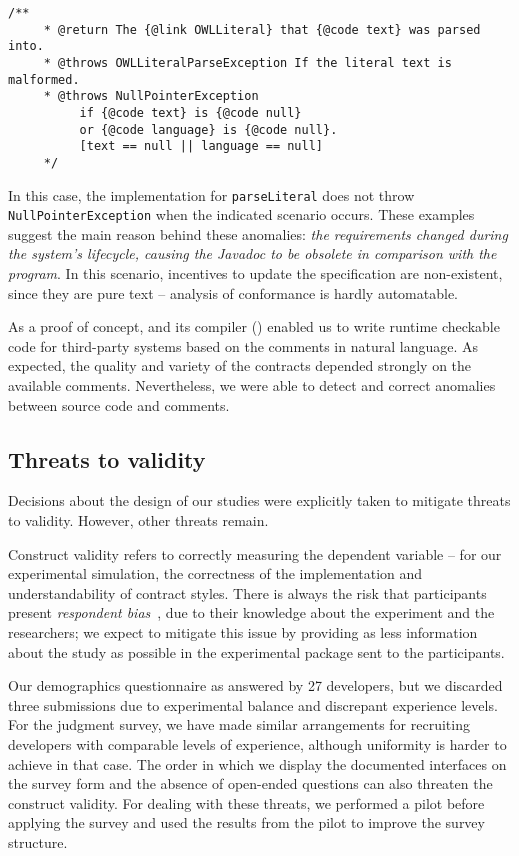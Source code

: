 \begin{lstlisting}[basicstyle=\footnotesize\ttfamily,name=figxpi, frame=lines, mathescape=true]
 /**
     * @return The {@link OWLLiteral} that {@code text} was parsed into.
     * @throws OWLLiteralParseException If the literal text is malformed.
     * @throws NullPointerException 
          if {@code text} is {@code null} 
          or {@code language} is {@code null}. 
          [text == null || language == null]
     */
\end{lstlisting}

In this case, the implementation for \texttt{parseLiteral} does not throw \texttt{NullPointerException} when the indicated scenario occurs.
These examples suggest the main reason behind these anomalies: \emph{the requirements changed during the system's lifecycle, causing the Javadoc to be obsolete in comparison with the program}. In this scenario, incentives to update the specification are non-existent, since they are pure text -- analysis of conformance is hardly automatable. 

As a proof of concept, \contractjdoc{} and its compiler (\contractjdocCompiler{}) enabled us to write runtime
checkable code for third-party systems based on the comments in natural language.
As expected, the quality and variety of the contracts depended strongly on the available comments. Nevertheless, we were able to
detect and correct anomalies between source code and comments.

\subsection{Threats to validity}
\label{sec:CaseStudyThreats}

Decisions about the design of our studies were explicitly taken to mitigate threats to validity. However, other threats remain.

Construct validity refers to correctly measuring the
dependent variable -- for our experimental simulation, the correctness of the implementation and understandability of contract styles.
There is always the risk that participants present \emph{respondent bias}~\cite{refSurvey}, due to their knowledge about the experiment and the researchers; we expect to mitigate this issue by providing as less information about the study as possible in the experimental package sent to the participants.

Our demographics questionnaire as answered by 27 developers, but we discarded three submissions due to experimental balance and discrepant experience levels.
For the judgment survey, we have made similar arrangements for recruiting developers with comparable levels of experience, although uniformity is harder to achieve in that case.
The order in which we display the documented
interfaces on the survey form and the absence of open-ended questions can also threaten the construct validity. For dealing with these threats, we
performed a pilot before applying the survey and used the results from the pilot to improve the survey structure. 



